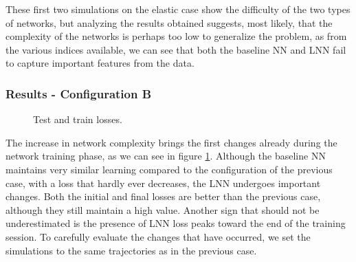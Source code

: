 \documentclass[a4paper]{article}
\begin{document}
These first two simulations on the elastic case show the difficulty of the two types of networks, but analyzing the results obtained suggests, most likely, that the complexity of the networks is perhaps too low to generalize the problem, as from the various indices available, we can see that both the baseline NN and LNN fail to capture important features from the data.\\

\subsubsection{Results - Configuration B}
\begin{figure}
    \centering
    \qquad
    \caption{Test and train losses.}
    \label{fig:elastic_losses_500_4}
\end{figure}

The increase in network complexity brings the first changes already during the network training phase, as we can see in figure \ref{fig:elastic_losses_500_4}. Although the baseline NN maintains very similar learning compared to the configuration of the previous case, with a loss that hardly ever decreases, the LNN undergoes important changes. Both the initial and final losses are better than the previous case, although they still maintain a high value. Another sign that should not be underestimated is the presence of LNN loss peaks toward the end of the training session. To carefully evaluate the changes that have occurred, we set the simulations to the same trajectories as in the previous case.\\
\end{document}
